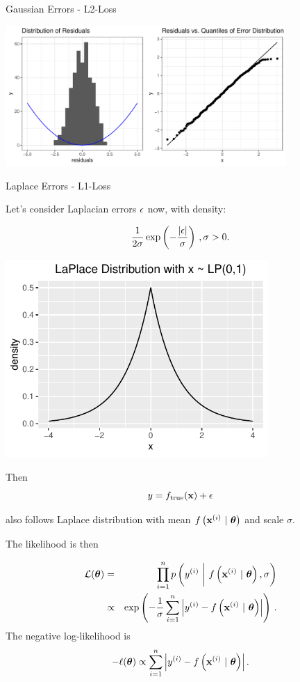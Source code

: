 \documentclass[11pt,compress,t,notes=noshow, xcolor=table]{beamer}
\begin{document}
\begin{vbframe}{Gaussian Errors - L2-Loss}
\begin{center}
\includegraphics[width = 0.8\textwidth]{figure/residuals_plot_L2.pdf}
\end{center}
\end{vbframe}

\begin{vbframe}{Laplace Errors - L1-Loss}

Let's consider Laplacian errors $\epsilon$ now, with density: 

\begin{minipage}{0.5\textwidth}
$$
 \frac{1}{2\sigma} \exp\left(-\frac{|\epsilon|}{\sigma}\right)\,, \sigma > 0.
$$
\end{minipage}%
\begin{minipage}{0.5\textwidth}
\includegraphics[width = 0.75\textwidth]{figure/laplace_plot.pdf}
\end{minipage}
Then
$$
y = f_{\text{true}}(\mathbf{x}) + \epsilon 
$$

also follows Laplace distribution with mean $f\left(\mathbf{x}^{(i)} ~|~ \bm{\theta}\right)$ and scale  $\sigma$. 

\framebreak 

The likelihood is then 

\begin{eqnarray*}
\mathcal{L}(\bm{\theta}) &=& \prod_{i=1}^n p\left(y^{(i)} ~\bigg|~ f\left(\mathbf{x}^{(i)} ~|~ \bm{\theta}\right), \sigma\right) \\ &\propto& \exp\left(-\frac{1}{\sigma}\sum\limits_{i=1}^n \left|y^{(i)} - f\left(\mathbf{x}^{(i)} ~|~ \bm{\theta}\right)\right|\right)\,.
\end{eqnarray*}
The negative log-likelihood is
$$
- \ell(\bm{\theta}) \propto \sum\limits_{i=1}^n \left|y^{(i)} - f\left(\mathbf{x}^{(i)} ~|~ \bm{\theta}\right)\right|.
$$


\end{vbframe}
\end{document}
